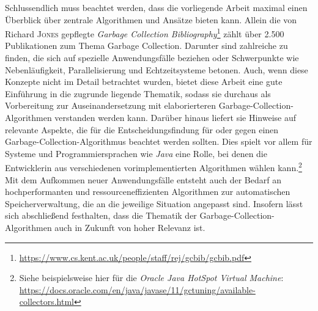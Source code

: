 Schlussendlich muss beachtet werden, dass die vorliegende Arbeit maximal einen Überblick über zentrale Algorithmen und Ansätze bieten kann.
Allein die von Richard \textsc{Jones} gepflegte \textit{Garbage Collection Bibliography}\footnote{\url{https://www.cs.kent.ac.uk/people/staff/rej/gcbib/gcbib.pdf}} zählt über 2.500 Publikationen zum Thema Garbage Collection.
Darunter sind zahlreiche zu finden, die sich auf spezielle Anwendungsfälle beziehen oder Schwerpunkte wie Nebenläufigkeit, Parallelisierung und Echtzeitsysteme betonen.
Auch, wenn diese Konzepte nicht im Detail betrachtet wurden, bietet diese Arbeit eine gute Einführung in die zugrunde liegende Thematik, sodass sie durchaus als Vorbereitung zur Auseinandersetzung mit elaborierteren Garbage-Collection-Algorithmen verstanden werden kann.
Darüber hinaus liefert sie Hinweise auf relevante Aspekte, die für die Entscheidungsfindung für oder gegen einen Garbage-Collection-Algorithmus beachtet werden sollten.
Dies spielt vor allem für Systeme und Programmiersprachen wie \textit{Java} eine Rolle, bei denen die Entwicklerin aus verschiedenen vorimplementierten Algorithmen wählen kann.\footnote{Siehe beispielsweise hier für die \textit{Oracle Java HotSpot Virtual Machine}: \url{https://docs.oracle.com/en/java/javase/11/gctuning/available-collectors.html}}
Mit dem Aufkommen neuer Anwendungsfälle entsteht auch der Bedarf an hochperformanten und ressourceneffizienten Algorithmen zur automatischen Speicherverwaltung, die an die jeweilige Situation angepasst sind.
Insofern lässt sich abschließend festhalten, dass die Thematik der Garbage-Collection-Algorithmen auch in Zukunft von hoher Relevanz ist.
